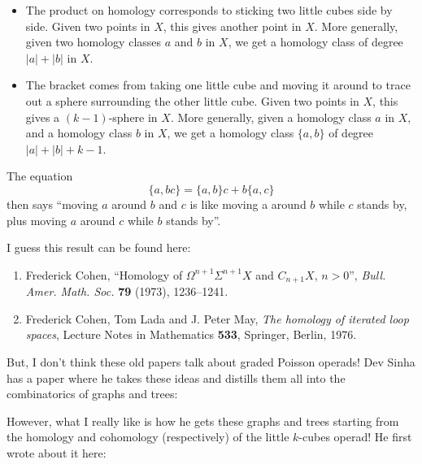 \documentclass{article}
\def\tightlist{}
\renewcommand{\texttt}[1]{%
  \begingroup
  \ttfamily
  \begingroup\lccode`~=`/\lowercase{\endgroup\def~}{/\discretionary{}{}{}}%
  \begingroup\lccode`~=`[\lowercase{\endgroup\def~}{[\discretionary{}{}{}}%
  \begingroup\lccode`~=`.\lowercase{\endgroup\def~}{.\discretionary{}{}{}}%
  \catcode`/=\active\catcode`[=\active\catcode`.=\active
  \scantokens{#1\noexpand}%
  \endgroup
}
\begin{document}
\begin{itemize}
\tightlist
\item
  The product on homology corresponds to sticking two little cubes side
  by side. Given two points in \(X\), this gives another point in \(X\).
  More generally, given two homology classes \(a\) and \(b\) in \(X\),
  we get a homology class of degree \(|a| + |b|\) in \(X\).
\item
  The bracket comes from taking one little cube and moving it around to
  trace out a sphere surrounding the other little cube. Given two points
  in \(X\), this gives a \((k-1)\)-sphere in \(X\). More generally,
  given a homology class \(a\) in \(X\), and a homology class \(b\) in
  \(X\), we get a homology class \(\{a,b\}\) of degree
  \(|a| + |b| + k - 1\).
\end{itemize}

The equation \[\{a,bc\} = \{a,b\}c + b\{a,c\}\] then says ``moving \(a\)
around \(b\) and \(c\) is like moving a around \(b\) while \(c\) stands
by, plus moving \(a\) around \(c\) while \(b\) stands by''.

I guess this result can be found here:

\begin{enumerate}
\def\labelenumi{\arabic{enumi})}
\setcounter{enumi}{8}
\item
  Frederick Cohen, ``Homology of \(\Omega^{n+1}\Sigma^{n+1}X\) and
  \(C_{n+1}X\), \(n>0\)'', \emph{Bull. Amer. Math. Soc.} \textbf{79}
  (1973), 1236--1241.
\item
  Frederick Cohen, Tom Lada and J. Peter May, \emph{The homology of
  iterated loop spaces}, Lecture Notes in Mathematics \textbf{533},
  Springer, Berlin, 1976.
\end{enumerate}

But, I don't think these old papers talk about graded Poisson operads!
Dev Sinha has a paper where he takes these ideas and distills them all
into the combinatorics of graphs and trees:


However, what I really like is how he gets these graphs and trees
starting from the homology and cohomology (respectively) of the little
\(k\)-cubes operad! He first wrote about it here:
\end{document}
